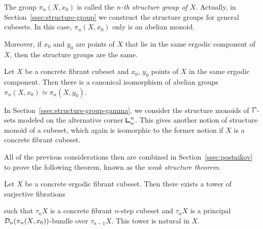 The group $\pi_n(X,x_0)$ is called the \emph{$n$-th structure group of $X$}.
Actually, in Section~\ref{ssec:structure-group} we construct the structure groups for general cubesets.
In this case, $\pi_n(X,x_0)$ only is an abelian monoid.

Moreover, if $x_0$ and $y_0$ are points of $X$ that lie in the same ergodic component of $X$,
then the structure groups are the same.

\begin{proposition*}
Let $X$ be a concrete fibrant cubeset and $x_0$, $y_0$ points of $X$ in the same ergodic component.
Then there is a canonical isomorphism of abelian groups $\pi_n(X,x_0)\simeq\pi_n(X,y_0)$.
\end{proposition*}

In Section~\ref{ssec:structure-group-gamma}, we consider the structure monoids of $\bbGamma$-sets
modeled on the alternative corner ${\bbcor}^n_\omega$.
This gives another notion of structure monoid of a cubeset,
which again is isomorphic to the former notion if $X$ is a concrete fibrant cubeset.

All of the previous considerations then are combined in Section~\ref{ssec:postnikov}
to prove the following theorem, known as the \emph{weak structure theorem}.

\begin{theorem*}
Let $X$ be a concrete ergodic fibrant cubeset.
Then there exists a tower of surjective fibrations
\begin{center}
\end{center}
such that $\tau_n X$ is a concrete fibrant $n$-step cubeset
and $\tau_n X$ is a principal $\mathcal{D}_n(\pi_n(X,x_0))$-bundle over $\tau_{n-1} X$.
This tower is natural in $X$.
\end{theorem*}

